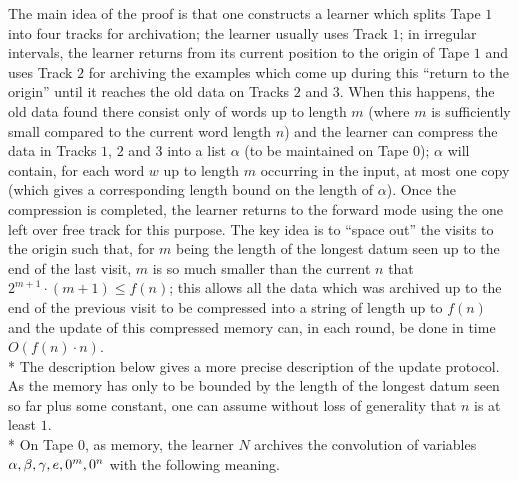 \documentclass{LMCS}
\theoremstyle{plain}\newtheorem{athm}[thm]{Theorem}
\theoremstyle{plain}\newtheorem{aprop}[thm]{Proposition}
\theoremstyle{plain}\newtheorem{aprob}[thm]{Open Problem}
\theoremstyle{plain}\newtheorem{acor}[thm]{Corollary}
\theoremstyle{plain}\newtheorem{alem}[thm]{Lemma}
\theoremstyle{definition}\newtheorem{adefn}[thm]{Definition}
\theoremstyle{definition}\newtheorem{arem}[thm]{Remark}
\theoremstyle{plain}\newtheorem{aexmp}[thm]{Example}
\theoremstyle{plain}\newtheorem{aclm}[thm]{Claim}
\def\sp{\\*\indent}
\begin{document}
\proof
The main idea of the proof is that one constructs a learner which splits
Tape $1$ into four 
tracks for archivation; the learner 
usually uses Track $1$; in irregular intervals, the learner returns from
its current position to the origin of Tape $1$ and uses Track $2$
for archiving the examples which come up during this ``return to
the origin'' until it reaches the old data on Tracks $2$ and $3$.
When this happens, the old data found there consist only of words
up to length $m$ (where $m$ is sufficiently small compared to the
current word length $n$) and the learner can compress the data in
Tracks $1$, $2$ and $3$ into a list $\alpha$ (to be maintained on
Tape $0$); $\alpha$ will contain, for each word $w$ up to length $m$ occurring
in the input, at most one copy (which gives a corresponding length bound
on the length of $\alpha$). Once the compression is completed, the
learner returns to the forward mode using the one left over free
track for this purpose. The key idea is to ``space out'' the visits
to the origin such that, for $m$ being the length of the longest datum
seen up to the end of the last visit, $m$ is so much smaller
than the current $n$ that $2^{m+1} \cdot (m+1) \leq f(n)$; this allows
all the data which was archived up to the end
of the previous visit to be compressed into a string of length
up to $f(n)$ and the update of this compressed memory can, in each
round, be done in time $O(f(n) \cdot n)$.
\sp
The description below gives a more precise description of the
update protocol. As the memory has only to be bounded by the length
of the longest datum seen so far plus some constant, one can assume
without loss of generality that $n$ is at least $1$.
\sp
On Tape $0$, as memory, the learner $N$ archives the convolution of variables
$\alpha,\beta,\gamma,e,\linebreak[3] 0^m,0^n$ with the following meaning.
\end{document}
